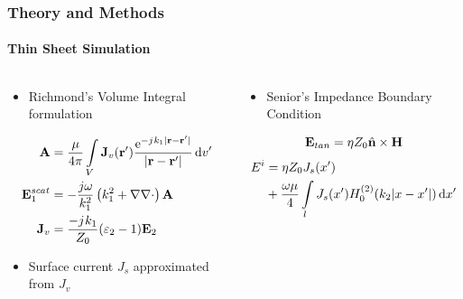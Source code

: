 \documentclass[mathserif,16pt,xcolor=table]{beamer}
\begin{document}
\begin{frame}
  \frametitle{Theory and Methods}
  \framesubtitle{Thin Sheet Simulation}
  \begin{columns}[T] %
    \begin{column}{.5\textwidth}
      \begin{itemize}
        \item{Richmond's Volume Integral formulation}
      \end{itemize}
      \begin{equation} \nonumber
        \begin{split}
          \mathbf{A} &= \frac{\mu}{4 \pi} \int\limits_{V} \mathbf{J}_v(\mathbf{r}')  \frac{ \mathrm{e}^{-{j}\mkern1mu k_1 |\mathbf{r} - \mathbf{r}'|}}{|\mathbf{r} - \mathbf{r}'|} \mathop{}\!\mathrm{d}{v'} \\
          \mathbf{E}_1^{scat} &= -\frac{j \omega}{k_1^2} \left( k_1^2 + \nabla \nabla \cdot \right) \mathbf{A} \\
          \mathbf{J}_v &= \frac{-{j}\mkern1mu k_1}{Z_0}(\varepsilon_2 - 1)\mathbf{E}_2
        \end{split}
        \label{eq:E1sc}
      \end{equation}
      \begin{itemize}
        \item{Surface current $J_s$ approximated from $J_v$}
      \end{itemize}
    \end{column}
    \begin{column}[T]{.5\textwidth}
      \begin{itemize}
        \item{Senior's Impedance Boundary Condition}
      \end{itemize}
      \begin{equation} \nonumber
        \mathbf{E}_{tan} = \eta Z_0 \hat{\mathbf{n}} \times \mathbf{H}
        \label{eq:eps}
      \end{equation}
      \begin{equation} \nonumber
        \begin{split}
          E^i &= \eta Z_0 J_s(x') \\
          & + \frac{\omega \mu}{4}  \int\limits_{l} J_s(x')  H_0^{(2)}(k_2 |x - x'|) \mathop{}\!\mathrm{d}{x'}
        \end{split}
        \label{eq:eps}
      \end{equation}
      \end{column}%
    \end{columns}
  \end{frame}
\end{document}
